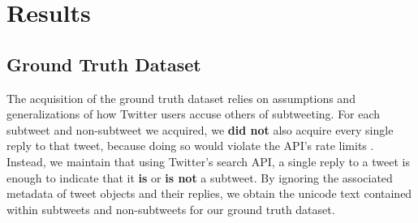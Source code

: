 \documentclass[11pt, twoside, reqno]{book}
\begin{document}
\chapter{Results}
\label{results}

\section{Ground Truth Dataset}
\label{ground_truth_dataset}

The acquisition of the ground truth dataset relies on assumptions and generalizations of how Twitter users accuse others of subtweeting. For each subtweet and non-subtweet we acquired, we \textbf{did not} also acquire every single reply to that tweet, because doing so would violate the API's rate limits \cite{twitter_rate_limits}. Instead, we maintain that using Twitter's search API, a single reply to a tweet is enough to indicate that it \textbf{is} or \textbf{is not} a subtweet. By ignoring the associated metadata of tweet objects and their replies, we obtain the unicode text contained within subtweets and non-subtweets for our ground truth dataset.
\end{document}
